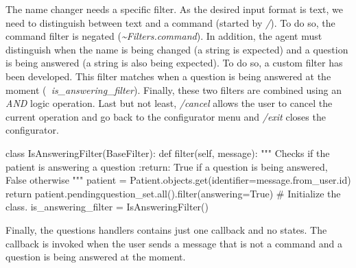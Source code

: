 \documentclass[12pt,english]{article}
\begin{document}
The name changer needs a specific filter. As the desired input format is text, we need to distinguish between text and a command (started by \emph{/}). To do so, the command filter is negated (\emph{\~{}Filters.command}). In addition, the agent must distinguish when the name is being changed (a string is expected) and a question is being answered (a string is also being expected). To do so, a custom filter has been developed. This filter matches when a question is being answered at the moment (\emph{~is\_answering\_filter}). Finally, these two filters are combined using an \emph{AND} logic operation. Last but not least, \emph{/cancel} allows the user to cancel the current operation and go back to the configurator menu and \emph{/exit} closes the configurator.

\begin{python}[caption={IsAnswering filter}, captionpos=b]
class IsAnsweringFilter(BaseFilter):
    def filter(self, message):
        """
        Checks if the patient is answering a question
        :return: True if a question is being answered, False otherwise
        """
        patient = Patient.objects.get(identifier=message.from_user.id)
        return patient.pendingquestion_set.all().filter(answering=True)
  # Initialize the class.
  is_answering_filter = IsAnsweringFilter()
\end{python}

Finally, the questions handlers contains just one callback and no states. The callback is invoked when the user sends a message that is not a command and a question is being answered at the moment.
\end{document}
